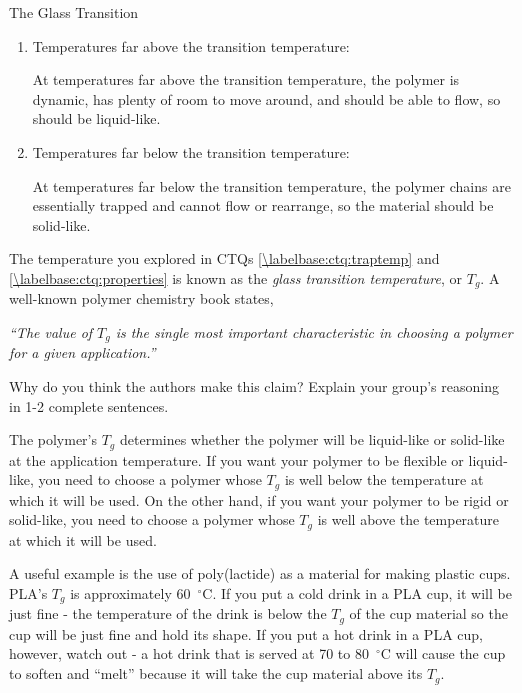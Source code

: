 \begin{activity}{The Glass Transition}
\begin{ctqs}
		\begin{enumerate}
			\item Temperatures far above the transition temperature:
			
				\begin{solution}[0.5in]{}
					At temperatures far above the transition temperature, the polymer is dynamic, has plenty of room to move around, and should be able to flow, so should be liquid-like.
				\end{solution}
			
			\item Temperatures far below the transition temperature:
			
				\begin{solution}[0.5in]{}
					At temperatures far below the transition temperature, the polymer chains are essentially trapped and cannot flow or rearrange, so the material should be solid-like.
				\end{solution}
			
		\end{enumerate}
		
	\question The temperature you explored in CTQs \ref{\labelbase:ctq:traptemp} and \ref{\labelbase:ctq:properties} is known as the \emph{glass transition temperature}, or $T_g$.  A well-known polymer chemistry book states,
	
		\emph{``The value of $T_g$ is the single most important characteristic in choosing a polymer for a given application.''}
		
		Why do you think the authors make this claim?  Explain your group's reasoning in 1-2 complete sentences.
			
				\begin{solution}[1.75in]{}
				
					The polymer's $T_g$ determines whether the polymer will be liquid-like or solid-like at the application temperature.  If you want your polymer to be flexible or liquid-like, you need to choose a polymer whose $T_g$ is well below the temperature at which it will be used.  On the other hand, if you want your polymer to be rigid or solid-like, you need to choose a polymer whose $T_g$ is well above the temperature at which it will be used.
					
					A useful example is the use of poly(lactide) as a material for making plastic cups.  PLA's $T_g$ is approximately 60~$^\circ$C.  If you put a cold drink in a PLA cup, it will be just fine - the temperature of the drink is below the $T_g$ of the cup material so the cup will be just fine and hold its shape.  If you put a hot drink in a PLA cup, however, watch out - a hot drink that is served at 70 to 80~$^\circ$C will cause the cup to soften and ``melt'' because it will take the cup material above its $T_g$.
					

\end{solution}
\end{ctqs}
\end{activity}
